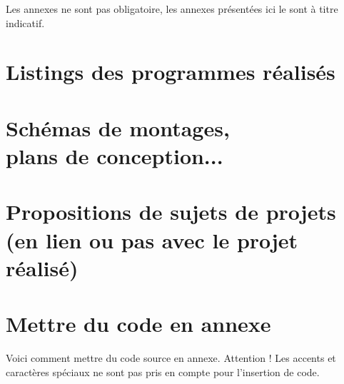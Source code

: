 \documentclass[a4paper, 12pt]{report} %
\begin{document}
Les annexes ne sont pas obligatoire, les annexes présentées ici le sont à titre indicatif.
	\chapter{Listings des programmes réalisés}
	\chapter{Schémas de montages, \\plans de conception...}
	\chapter{Propositions de sujets de projets \\ (en lien ou pas avec le projet réalisé)}
	\chapter{Mettre du code en annexe}

	Voici comment mettre du code source en annexe. Attention ! Les accents et caractères spéciaux ne sont pas pris en compte pour l'insertion de code.
\end{document}
